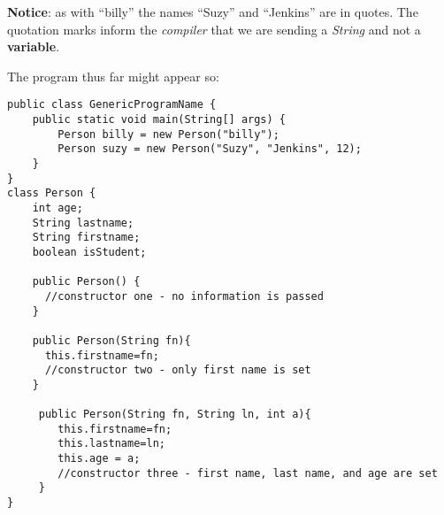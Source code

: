 \documentclass{article}
\begin{document}
\begin{flushleft}
\textbf{Notice}: as with ``billy'' the names ``Suzy'' and ``Jenkins'' are in quotes. The quotation marks inform the \emph{compiler} that we are sending a \emph{String} and not a \textbf{variable}. \par
The program thus far might appear so:
\label{code:classesnomethods}
\begin{tcolorbox}[enhanced,breakable, before upper={\let\clearpage\relax}, width=5.5in,center upper,
    fontupper=\bfseries,drop fuzzy shadow southeast,
    boxrule=0.4pt,sharp corners,colframe=gray!80!black,colback=gray!10]
\begin{verbatim}
public class GenericProgramName {
    public static void main(String[] args) {
        Person billy = new Person("billy");
        Person suzy = new Person("Suzy", "Jenkins", 12);
    }
}
class Person {
    int age; 
    String lastname;
    String firstname;
    boolean isStudent; 
    
    public Person() {
      //constructor one - no information is passed
    }
    
    public Person(String fn){
      this.firstname=fn;
      //constructor two - only first name is set
    }
    
     public Person(String fn, String ln, int a){
        this.firstname=fn; 
        this.lastname=ln;
        this.age = a;
        //constructor three - first name, last name, and age are set
     }
}
\end{verbatim}
\end{tcolorbox}



\end{flushleft}
\end{document}
